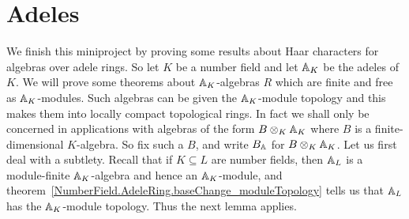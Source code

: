\section{Adeles}

We finish this miniproject by proving some results about Haar characters for
algebras over adele rings.
So let $K$ be a number field and let $\mathbb{A}_K$ be the adeles of $K$.
We will prove some theorems about $\mathbb{A}_K$-algebras $R$ which are finite
and free as $\mathbb{A}_K$-modules. Such algebras can be given the $\mathbb{A}_K$-module topology
and this makes them into locally compact topological rings. In fact we shall only be concerned
in applications with algebras of the form $B\otimes_K\mathbb{A}_K$ where $B$ is a finite-dimensional
$K$-algebra. So fix such a $B$, and write $B_{\mathbb{A}}$ for $B\otimes_K\mathbb{A}_K$. Let us first
deal with a subtlety. Recall that if $K\subseteq L$ are number fields, then $\mathbb{A}_L$ is a
module-finite $\mathbb{A}_K$-algebra and hence an $\mathbb{A}_K$-module, and
theorem~\ref{NumberField.AdeleRing.baseChange_moduleTopology}
tells us that $\mathbb{A}_L$ has the $\mathbb{A}_K$-module topology. Thus the next lemma applies.

